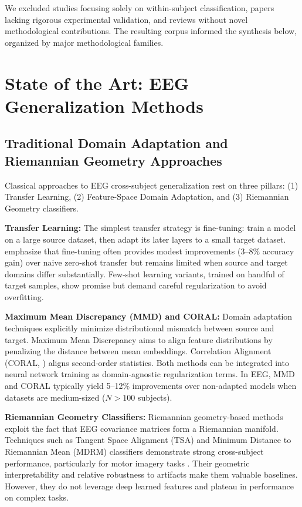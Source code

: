 \documentclass[11pt]{article}
\begin{document}
We excluded studies focusing solely on within-subject classification, papers lacking rigorous experimental validation, and reviews without novel methodological contributions. The resulting corpus informed the synthesis below, organized by major methodological families.

\section{State of the Art: EEG Generalization Methods}\label{sec:sota}

\subsection{Traditional Domain Adaptation and Riemannian Geometry Approaches}

Classical approaches to EEG cross-subject generalization rest on three pillars: (1) Transfer Learning, (2) Feature-Space Domain Adaptation, and (3) Riemannian Geometry classifiers.

\textbf{Transfer Learning:} The simplest transfer strategy is fine-tuning: train a model on a large source dataset, then adapt its later layers to a small target dataset. \citet{lotte2018review} emphasize that fine-tuning often provides modest improvements (3--8\% accuracy gain) over naive zero-shot transfer but remains limited when source and target domains differ substantially. Few-shot learning variants, trained on handful of target samples, show promise but demand careful regularization to avoid overfitting.

\textbf{Maximum Mean Discrepancy (MMD) and CORAL:} Domain adaptation techniques explicitly minimize distributional mismatch between source and target. Maximum Mean Discrepancy aims to align feature distributions by penalizing the distance between mean embeddings. Correlation Alignment (CORAL, \citet{sun2016deep}) aligns second-order statistics. Both methods can be integrated into neural network training as domain-agnostic regularization terms. In EEG, MMD and CORAL typically yield 5--12\% improvements over non-adapted models when datasets are medium-sized ($N > 100$ subjects).

\textbf{Riemannian Geometry Classifiers:} Riemannian geometry-based methods exploit the fact that EEG covariance matrices form a Riemannian manifold. Techniques such as Tangent Space Alignment (TSA) and Minimum Distance to Riemannian Mean (MDRM) classifiers demonstrate strong cross-subject performance, particularly for motor imagery tasks \citep{lotte2017riemannian}. Their geometric interpretability and relative robustness to artifacts make them valuable baselines. However, they do not leverage deep learned features and plateau in performance on complex tasks.
\end{document}
